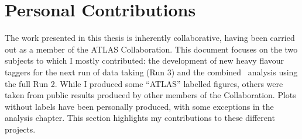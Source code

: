 \chapter*{\color{oxfordblue} Personal Contributions}

The work presented in this thesis is inherently collaborative, having been carried out as a member of the ATLAS Collaboration. This document focuses on the two subjects to which I mostly contributed: the development of new heavy flavour taggers for the next run of data taking (Run 3) and the combined \vhbc\ analysis using the full Run 2. While I produced some ``ATLAS'' labelled figures, others were taken from public results produced by other members of the Collaboration. Plots without labels have been personally produced, with some exceptions in the analysis chapter. This section highlights my contributions to these different projects.

